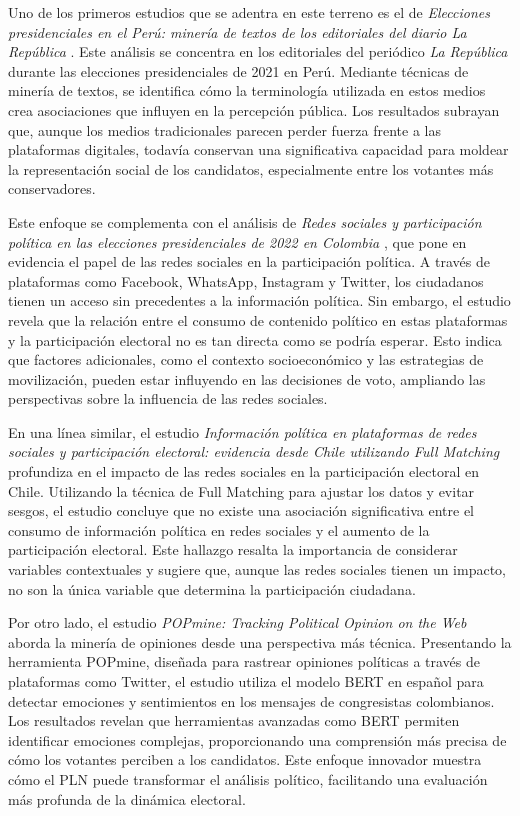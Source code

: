 \documentclass[10pt, a4paper]{article}
\begin{document}
	Uno de los primeros estudios que se adentra en este terreno es el de \textit{Elecciones presidenciales en el Perú: minería de textos de los editoriales del diario La República} \parencite{Castro2021}. Este análisis se concentra en los editoriales del periódico \textit{La República} durante las elecciones presidenciales de 2021 en Perú. Mediante técnicas de minería de textos, se identifica cómo la terminología utilizada en estos medios crea asociaciones que influyen en la percepción pública. Los resultados subrayan que, aunque los medios tradicionales parecen perder fuerza frente a las plataformas digitales, todavía conservan una significativa capacidad para moldear la representación social de los candidatos, especialmente entre los votantes más conservadores.
	
	Este enfoque se complementa con el análisis de \textit{Redes sociales y participación política en las elecciones presidenciales de 2022 en Colombia} \parencite{Ramirez2022}, que pone en evidencia el papel de las redes sociales en la participación política. A través de plataformas como Facebook, WhatsApp, Instagram y Twitter, los ciudadanos tienen un acceso sin precedentes a la información política. Sin embargo, el estudio revela que la relación entre el consumo de contenido político en estas plataformas y la participación electoral no es tan directa como se podría esperar. Esto indica que factores adicionales, como el contexto socioeconómico y las estrategias de movilización, pueden estar influyendo en las decisiones de voto, ampliando las perspectivas sobre la influencia de las redes sociales.
	
	En una línea similar, el estudio \textit{Información política en plataformas de redes sociales y participación electoral: evidencia desde Chile utilizando Full Matching} \parencite{Fernandez2020} profundiza en el impacto de las redes sociales en la participación electoral en Chile. Utilizando la técnica de Full Matching para ajustar los datos y evitar sesgos, el estudio concluye que no existe una asociación significativa entre el consumo de información política en redes sociales y el aumento de la participación electoral. Este hallazgo resalta la importancia de considerar variables contextuales y sugiere que, aunque las redes sociales tienen un impacto, no son la única variable que determina la participación ciudadana.
	
	Por otro lado, el estudio \textit{POPmine: Tracking Political Opinion on the Web} \parencite{Perez2020} aborda la minería de opiniones desde una perspectiva más técnica. Presentando la herramienta POPmine, diseñada para rastrear opiniones políticas a través de plataformas como Twitter, el estudio utiliza el modelo BERT en español para detectar emociones y sentimientos en los mensajes de congresistas colombianos. Los resultados revelan que herramientas avanzadas como BERT permiten identificar emociones complejas, proporcionando una comprensión más precisa de cómo los votantes perciben a los candidatos. Este enfoque innovador muestra cómo el PLN puede transformar el análisis político, facilitando una evaluación más profunda de la dinámica electoral.
	
\end{document}
